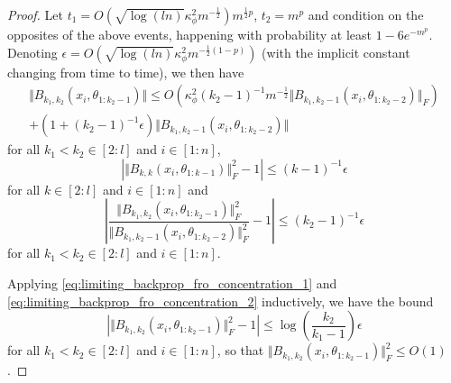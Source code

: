 \documentclass[twoside,11pt]{article}
\begin{document}
\begin{proof}
Let $t_1 = O(\sqrt{\log(ln)} \kappa_\phi^2 m^{-\frac{1}{2}}) m^{\frac{1}{2}p}$, $t_2 = m^p$ and condition on the opposites of the above events, happening with probability at least $1 - 6e^{-m^p}$. Denoting $\epsilon = O\left( \sqrt{\log(ln)} \kappa_\phi^2 m^{-\frac{1}{2}(1-p)} \right)$ (with the implicit constant changing from time to time), we then have
\begin{multline}\label{eq:limiting_backprop_norm_concentration}
\Vert B_{k_1, k_2}(x_i, \theta_{1 : k_2-1}) \Vert 
\leq O\left( \kappa_\phi^2 (k_2-1)^{-1} m^{-\frac{1}{2}} \Vert B_{k_1, k_2-1}(x_i, \theta_{1 : k_2-2}) \Vert_F \right) \\
+ \left( 1 + (k_2-1)^{-1} \epsilon \right) \Vert B_{k_1, k_2-1}(x_i, \theta_{1 : k_2-2}) \Vert
\end{multline}
for all $k_1 < k_2 \in [2:l]$ and $i \in [1:n]$, 
\begin{equation}\label{eq:limiting_backprop_fro_concentration_1}
\left\vert \Vert B_{k,k}(x_i, \theta_{1 : k-1}) \Vert_F^2 - 1 \right\vert
\leq (k-1)^{-1} \epsilon
\end{equation}
for all $k \in [2:l]$ and $i \in [1:n]$ and
\begin{equation}\label{eq:limiting_backprop_fro_concentration_2}
\left\vert \frac{\Vert B_{k_1,k_2}(x_i, \theta_{1 : k_2-1}) \Vert_F^2}{\Vert B_{k_1,k_2-1}(x_i, \theta_{1 : k_2-2}) \Vert_F^2} - 1 \right\vert
\leq (k_2-1)^{-1} \epsilon
\end{equation}
for all $k_1 < k_2 \in [2:l]$ and $i \in [1:n]$.

Applying \eqref{eq:limiting_backprop_fro_concentration_1} and \eqref{eq:limiting_backprop_fro_concentration_2} inductively, we have the bound
\[
\left\vert \Vert B_{k_1,k_2}(x_i, \theta_{1 : k_2-1}) \Vert_F^2 - 1 \right\vert
\leq \log\left( \frac{k_2}{k_1-1} \right) \epsilon
\]
for all $k_1 < k_2 \in [2:l]$ and $i \in [1:n]$, so that $\Vert B_{k_1,k_2}(x_i, \theta_{1 : k_2-1}) \Vert_F^2 \leq O(1)$.


\end{proof}
\end{document}
